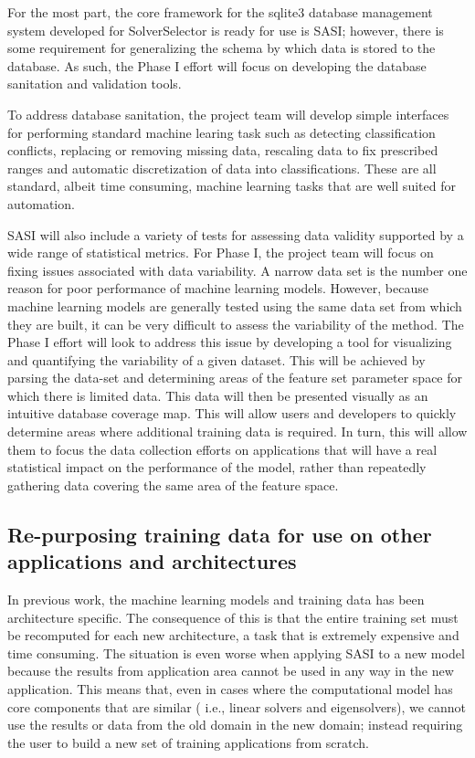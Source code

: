 For the most part, the core framework for the sqlite3 database management system developed for SolverSelector is ready for use is SASI; however, there is some requirement for generalizing the schema by which data is stored to the database. As such, the Phase I effort will focus on developing the database sanitation and validation tools. 

To address database sanitation, the project team will develop simple interfaces for performing standard machine learing task such as detecting classification conflicts, replacing or removing missing data, rescaling data to fix prescribed ranges and automatic discretization of data into classifications. These are all standard, albeit time consuming, machine learning tasks that are well suited for automation. 

SASI will also include a variety of tests for assessing data validity supported by a wide range of statistical metrics. For Phase I, the project team will focus on fixing issues associated with data variability. A narrow data set is the number one reason for poor performance of machine learning models. However, because machine learning models are generally tested using the same data set from which they are built, it can be very difficult to assess the variability of the method. The Phase I effort will look to address this issue by developing a tool for visualizing and quantifying the variability of a given dataset. This will be achieved by parsing the data-set and determining areas of the feature set parameter space for which there is limited data. This data will then be presented visually as an intuitive database coverage map. This will allow users and developers to quickly determine areas where additional training data is required. In turn, this will allow them to focus the data collection efforts on applications that will have a real statistical impact on the performance of the model, rather than repeatedly gathering data covering the same area of the feature space. 


\subsection{ Re-purposing training data for use on other applications and architectures }

In previous work, the machine learning models and training data has been architecture specific. The consequence of this is that the entire training set must be recomputed for each new architecture, a task that is extremely expensive and time consuming. The situation is even worse when applying SASI to a new model because the results from application area cannot be used in any way in the new application. This means that, even in cases where the computational model has core components that are similar ( i.e., linear solvers and eigensolvers), we cannot use the results or data from the old domain in the new domain; instead requiring the user to build a new set of training applications from scratch.  

